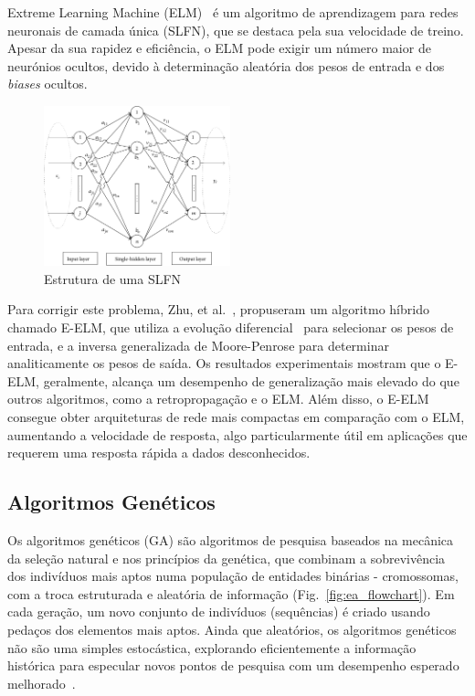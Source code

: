 Extreme Learning Machine (ELM)~\cite{Guang-BinHuang2004ExtremeNetworks} é um algoritmo de aprendizagem para redes neuronais de camada única (SLFN), que se destaca pela sua velocidade de treino.
Apesar da sua rapidez e eficiência, o ELM pode exigir um número maior de neurónios ocultos, devido à determinação aleatória dos pesos de entrada e dos \textit{biases} ocultos.

\begin{figure}[htbp]
    \centering
    \includegraphics[width=0.48\textwidth]{imagens/slfn}
    \caption{Estrutura de uma SLFN~\cite{Erdem2020IntroductionMachines}}
    \label{fig:slfn}
\end{figure}

Para corrigir este problema, Zhu, et al.~\cite{Zhu2005EvolutionaryMachine}, propuseram um algoritmo híbrido chamado E-ELM, que utiliza a evolução diferencial~\cite{Storn1997DifferentialSpaces} para selecionar os pesos de entrada, e a inversa generalizada de Moore-Penrose para determinar analiticamente os pesos de saída.
Os resultados experimentais mostram que o E-ELM, geralmente, alcança um desempenho de generalização mais elevado do que outros algoritmos, como a retropropagação e o ELM. Além disso, o E-ELM consegue obter arquiteturas de rede mais compactas em comparação com o ELM, aumentando a velocidade de resposta, algo particularmente útil em aplicações que requerem uma resposta rápida a dados desconhecidos.

\subsection{Algoritmos Genéticos}\label{subsec:ga}

Os algoritmos genéticos (GA) são algoritmos de pesquisa baseados na mecânica da seleção natural e nos princípios da genética, que combinam a sobrevivência dos indivíduos mais aptos numa população de entidades binárias - cromossomas, com a troca estruturada e aleatória de informação (Fig.~\ref{fig:ea_flowchart}). Em cada geração, um novo conjunto de indivíduos (sequências) é criado usando pedaços dos elementos mais aptos.
Ainda que aleatórios, os algoritmos genéticos não são uma simples  estocástica, explorando eficientemente a informação histórica para especular novos pontos de pesquisa com um desempenho esperado melhorado~\cite{Goldberg1989GeneticLearning}.


